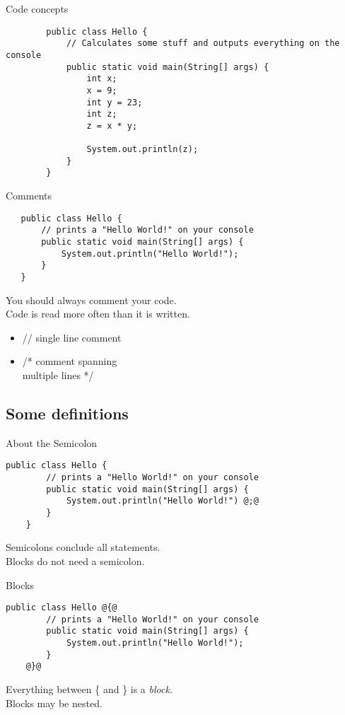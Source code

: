 \begin{frame}[fragile]{Code concepts}
	\begin{lstlisting}
		public class Hello {
			// Calculates some stuff and outputs everything on the console
			public static void main(String[] args) {	        
				int x;
				x = 9;
				int y = 23;
				int z;
				z = x * y;
				
				System.out.println(z);
			}
		}
	\end{lstlisting}
\end{frame}

\begin{frame}[fragile]{Comments}
   \begin{lstlisting}
   public class Hello {
       // prints a "Hello World!" on your console
       public static void main(String[] args) {
           System.out.println("Hello World!");
       }
   }
   \end{lstlisting}
   You should always comment your code. \\
   Code is read more often than it is written.
   \begin{itemize}
       \item // single line comment
       \item /* comment spanning \\
           multiple lines */
   \end{itemize}
\end{frame}

\subsection{Some definitions}

\begin{frame}[fragile]{About the Semicolon}
	\begin{lstlisting}[style=base]
	public class Hello {
	    // prints a "Hello World!" on your console
	    public static void main(String[] args) {
	        System.out.println("Hello World!") @;@
	    }
	}
	\end{lstlisting}
	Semicolons conclude all statements. \\
	Blocks do not need a semicolon.
\end{frame}

\begin{frame}[fragile]{Blocks}
	\begin{lstlisting}[style=base]
	public class Hello @{@
	    // prints a "Hello World!" on your console
	    public static void main(String[] args) {
	        System.out.println("Hello World!");
	    }
	@}@
	\end{lstlisting}
	Everything between \{ and \} is a \emph{block}. \\
	Blocks may be nested.
\end{frame}

